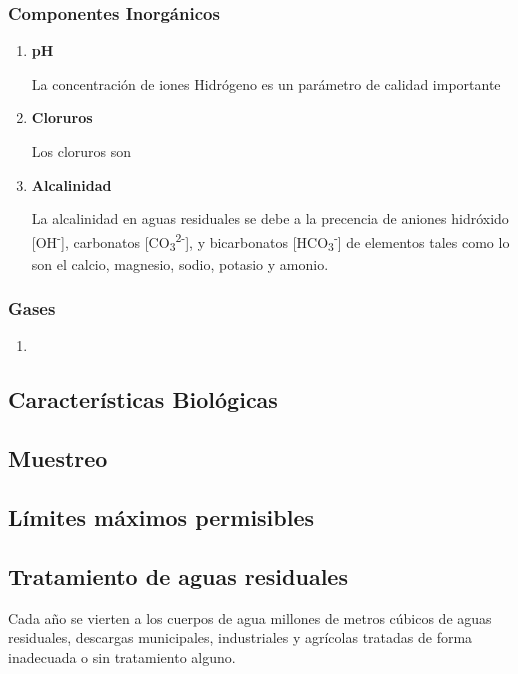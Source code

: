 \subsubsection{Componentes Inorgánicos}
\begin{enumerate}[label=\textbf{\alph*{.-}}]
	\item \textbf{pH}\par 
	La concentración de iones Hidrógeno es un parámetro de calidad importante
	\item \textbf{Cloruros}\par 
	Los cloruros son
	\item \textbf{Alcalinidad}\par
	La alcalinidad en aguas residuales se debe a la precencia de aniones hidróxido [OH\textsuperscript{-}], carbonatos [CO\textsubscript{3}\textsuperscript{2-}], y bicarbonatos [HCO\textsubscript{3}\textsuperscript{-}] de elementos tales como lo son el calcio, magnesio, sodio, potasio y amonio.
\end{enumerate}
\subsubsection{Gases}
\begin{enumerate}[label=\textbf{\alph*{.-}}]
	\item 
\end{enumerate}
\subsection{Características Biológicas}
\subsection{Muestreo}
\subsection{Límites máximos permisibles}\label{NOM2021}
\subsection{Tratamiento de aguas residuales}
Cada año se vierten a los cuerpos de agua millones de metros cúbicos de aguas residuales, descargas municipales, industriales y agrícolas tratadas de forma inadecuada o sin tratamiento alguno.
